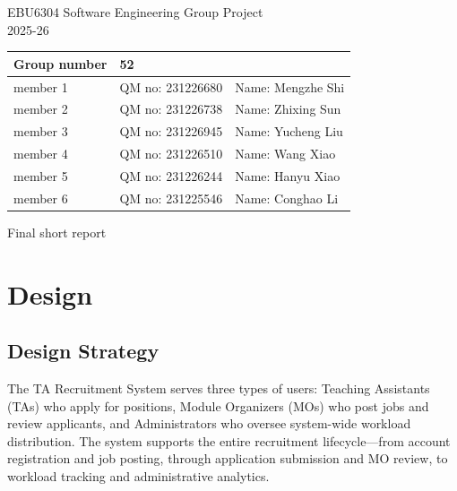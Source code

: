 \documentclass[12pt, a4paper]{article}
\begin{document}
\begin{center}
    {\huge \textcolor{TemplateBlue}{EBU6304 Software Engineering Group Project}}\\[1.5em]
    {\Large 2025-26}\\[1.5em]
\end{center}

\begin{table}[h]
\centering
\renewcommand{\arraystretch}{1.2}
\begin{tabular}{|l|l|l|}
\hline
\textbf{Group number} & 52 & \\ \hline
member 1 & QM no: 231226680 & Name: Mengzhe Shi \\ \hline
member 2 & QM no: 231226738 & Name: Zhixing Sun \\ \hline
member 3 & QM no: 231226945 & Name: Yucheng Liu \\ \hline
member 4 & QM no: 231226510 & Name: Wang Xiao \\ \hline
member 5 & QM no: 231226244 & Name: Hanyu Xiao \\ \hline
member 6 & QM no: 231225546 & Name: Conghao Li \\ \hline
\end{tabular}
\end{table}

\vspace{1.5em}
{\huge \textcolor{TemplateBlue}{Final short report}}\\[1.5em]

\section{Design}

\subsection{Design Strategy}
The TA Recruitment System serves three types of users: Teaching Assistants (TAs) who apply for positions, Module Organizers (MOs) who post jobs and review applicants, and Administrators who oversee system-wide workload distribution. The system supports the entire recruitment lifecycle---from account registration and job posting, through application submission and MO review, to workload tracking and administrative analytics.
\end{document}
